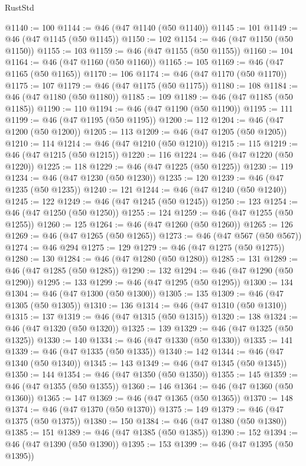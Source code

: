 \begin{lexlean}{RustStd}
\begin{coremodule}
@1140 := 100
@1144 := @46 (@47 @1140 (@50 @1140))
@1145 := 101
@1149 := @46 (@47 @1145 (@50 @1145))
@1150 := 102
@1154 := @46 (@47 @1150 (@50 @1150))
@1155 := 103
@1159 := @46 (@47 @1155 (@50 @1155))
@1160 := 104
@1164 := @46 (@47 @1160 (@50 @1160))
@1165 := 105
@1169 := @46 (@47 @1165 (@50 @1165))
@1170 := 106
@1174 := @46 (@47 @1170 (@50 @1170))
@1175 := 107
@1179 := @46 (@47 @1175 (@50 @1175))
@1180 := 108
@1184 := @46 (@47 @1180 (@50 @1180))
@1185 := 109
@1189 := @46 (@47 @1185 (@50 @1185))
@1190 := 110
@1194 := @46 (@47 @1190 (@50 @1190))
@1195 := 111
@1199 := @46 (@47 @1195 (@50 @1195))
@1200 := 112
@1204 := @46 (@47 @1200 (@50 @1200))
@1205 := 113
@1209 := @46 (@47 @1205 (@50 @1205))
@1210 := 114
@1214 := @46 (@47 @1210 (@50 @1210))
@1215 := 115
@1219 := @46 (@47 @1215 (@50 @1215))
@1220 := 116
@1224 := @46 (@47 @1220 (@50 @1220))
@1225 := 118
@1229 := @46 (@47 @1225 (@50 @1225))
@1230 := 119
@1234 := @46 (@47 @1230 (@50 @1230))
@1235 := 120
@1239 := @46 (@47 @1235 (@50 @1235))
@1240 := 121
@1244 := @46 (@47 @1240 (@50 @1240))
@1245 := 122
@1249 := @46 (@47 @1245 (@50 @1245))
@1250 := 123
@1254 := @46 (@47 @1250 (@50 @1250))
@1255 := 124
@1259 := @46 (@47 @1255 (@50 @1255))
@1260 := 125
@1264 := @46 (@47 @1260 (@50 @1260))
@1265 := 126
@1269 := @46 (@47 @1265 (@50 @1265))
@1273 := @46 (@47 @567 (@50 @567))
@1274 := @46 @294
@1275 := 129
@1279 := @46 (@47 @1275 (@50 @1275))
@1280 := 130
@1284 := @46 (@47 @1280 (@50 @1280))
@1285 := 131
@1289 := @46 (@47 @1285 (@50 @1285))
@1290 := 132
@1294 := @46 (@47 @1290 (@50 @1290))
@1295 := 133
@1299 := @46 (@47 @1295 (@50 @1295))
@1300 := 134
@1304 := @46 (@47 @1300 (@50 @1300))
@1305 := 135
@1309 := @46 (@47 @1305 (@50 @1305))
@1310 := 136
@1314 := @46 (@47 @1310 (@50 @1310))
@1315 := 137
@1319 := @46 (@47 @1315 (@50 @1315))
@1320 := 138
@1324 := @46 (@47 @1320 (@50 @1320))
@1325 := 139
@1329 := @46 (@47 @1325 (@50 @1325))
@1330 := 140
@1334 := @46 (@47 @1330 (@50 @1330))
@1335 := 141
@1339 := @46 (@47 @1335 (@50 @1335))
@1340 := 142
@1344 := @46 (@47 @1340 (@50 @1340))
@1345 := 143
@1349 := @46 (@47 @1345 (@50 @1345))
@1350 := 144
@1354 := @46 (@47 @1350 (@50 @1350))
@1355 := 145
@1359 := @46 (@47 @1355 (@50 @1355))
@1360 := 146
@1364 := @46 (@47 @1360 (@50 @1360))
@1365 := 147
@1369 := @46 (@47 @1365 (@50 @1365))
@1370 := 148
@1374 := @46 (@47 @1370 (@50 @1370))
@1375 := 149
@1379 := @46 (@47 @1375 (@50 @1375))
@1380 := 150
@1384 := @46 (@47 @1380 (@50 @1380))
@1385 := 151
@1389 := @46 (@47 @1385 (@50 @1385))
@1390 := 152
@1394 := @46 (@47 @1390 (@50 @1390))
@1395 := 153
@1399 := @46 (@47 @1395 (@50 @1395))

\end{coremodule}
\end{lexlean}
